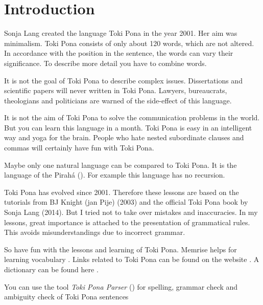 
\section{Introduction}

Sonja Lang created the language Toki Pona in the year 2001.
Her aim was minimalism.
Toki Pona consists of only about 120 words, which are not altered.
In accordance with the position in the sentence, the words can vary their significance.
To describe more detail you have to combine words.

It is not the goal of Toki Pona to describe complex issues.
Dissertations and scientific papers will never written in Toki Pona.
Lawyers, bureaucrats, theologians and politicians are warned of the side-effect of this language.

It is not the aim of Toki Pona to solve the communication problems in the world.
But you can learn this language in a month.
Toki Pona is easy in an intelligent way and yoga for the brain.
People who hate nested subordinate clauses and commas will certainly have fun with Toki Pona.

Maybe only one natural language can be compared to Toki Pona.
It is the language of the Pirah\'{a} (\cite{www:piraha:01}).
For example this language has no recursion.

Toki Pona has evolved since 2001.
Therefore these lessons are based on the tutorials from BJ Knight (jan Pije) \cite{www:Pije:01} (2003) and the official Toki Pona book \cite{www:tokipona.org} by Sonja Lang (2014).
But I tried not to take over mistakes and inaccuracies.
In my lessons, great importance is attached to the presentation of grammatical rules.
This avoids misunderstandings due to incorrect grammar.

So have fun with the lessons and learning of Toki Pona.
Memrise helps for learning vocabulary \cite{www:memrise:01}. Links related to Toki Pona can be found on the website \cite{www:rowa:01}.
A dictionary can be found here \cite{www:rowa:01}.

You can use the tool \textit{Toki Pona Parser} (\cite{www:rowa:02}) for spelling, grammar check and ambiguity check of Toki Pona sentences

